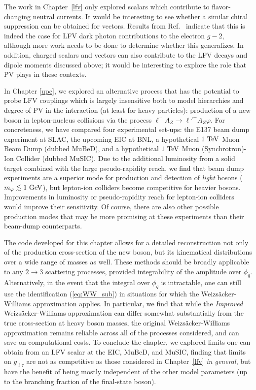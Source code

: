 The work in Chapter~\ref{lfv} only explored scalars which contribute to flavor-changing neutral currents. It would be interesting to see whether a similar chiral suppression can be obtained for vectors. Results from Ref.~\cite{Zhevlakov:2023jzt} indicate that this is indeed the case for LFV dark photon contributions to the electron $g-2$, although more work needs to be done to determine whether this generalizes. In addition, charged scalars and vectors can also contribute to the LFV decays and dipole moments discussed above; it would be interesting to explore the role that PV plays in these contexts.

In Chapter \ref{upc}, we explored an alternative process that has the potential to probe LFV couplings which is largely insensitive both to model hierarchies and degree of PV in the interaction (at least for heavy particles): production of a new boson in lepton-nucleus collisions via the process $\ell^- A_Z \rightarrow \ell'^- A_Z \varphi$. For concreteness, we have compared four experimental set-ups: the E137 beam dump experiment at SLAC, the upcoming EIC at BNL, a hypothetical $1~{\rm TeV}$ Muon Beam Dump (dubbed MuBeD), and a hypothetical $1~{\rm TeV}$ Muon (Synchrotron)-Ion Collider (dubbed MuSIC). Due to the additional luminosity from a solid target combined with the large pseudo-rapidity reach, we find that beam dump experiments are a superior mode for production and detection of {\it light} bosons ($m_\varphi \lesssim 1~{\rm GeV}$), but lepton-ion colliders become competitive for heavier bosons. Improvements in luminosity or pseudo-rapidity reach for lepton-ion colliders would improve their sensitivity. Of course, there are also other possible production modes that may be more promising at these experiments than their beam-dump counterparts.

The code developed for this chapter allows for a detailed reconstruction not only of the production cross-section of the new boson, but its kinematical distributions over a wide range of masses as well. These methods should be broadly applicable to any $2\rightarrow 3$ scattering processes, provided integrability of the amplitude over $\phi_q$. Alternatively, in the event that the integral over $\phi_q$ is intractable, one can still use the identification (\ref{eq:WW_sub}) in situations for which the Weizs\"acker-Williams approximation applies. In particular, we find that while the {\it Improved} Weizs\"acker-Williams approximation can differ somewhat substantially from the true cross-section at heavy boson masses, the original Weizs\"acker-Williams approximation remains reliable across all of the processes considered, and can save on computational costs. To conclude the chapter, we explored limits one can obtain from an LFV scalar at the EIC, MuBeD, and MuSIC, finding that limits on $g_{\ell\tau}$ are not as competitive as those considered in Chapter~{\ref{lfv}} {\it in general}, but have the benefit of being mostly independent of the other model parameters (up to the branching fraction of the final-state boson).


